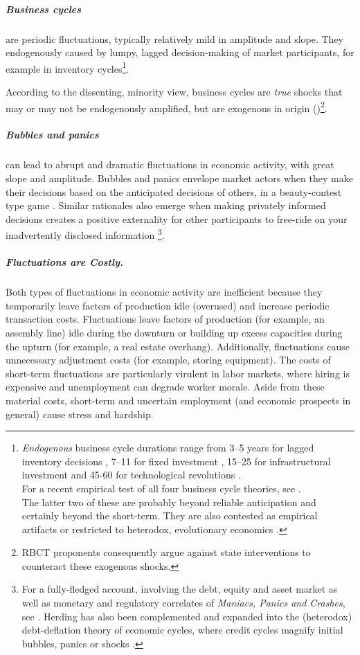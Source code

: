 \subparagraph{Business cycles} are periodic fluctuations, typically relatively mild in amplitude and slope. They endogenously caused by lumpy, lagged decision-making of market participants, for example in inventory cycles\footnote{
	\emph{Endogenous} business cycle durations range from 3--5 years for lagged inventory decisions \citep{Kitchin1923}, 7--11 for fixed investment \citep{Juglar1862}, 15--25 for infrastructural investment \citep{Kuznets1930} and 45-60 for technological revolutions \citep{Kondratiev1925}. \\ For a recent empirical test of all four business cycle theories, see \cite{Korotayev2010}. \\ The latter two of these are probably beyond reliable anticipation and certainly beyond the short-term. They are also contested as empirical artifacts \citep{Howrey1968} or restricted to heterodox, evolutionary economics \citep{Modelski2010}.}.

According to the dissenting, minority view, business cycles are \emph{true} shocks that may or may not be endogenously amplified, but are exogenous in origin (\citealt{Kydland1982})\footnote{
	\gls{RBCT} proponents consequently argue against state interventions to counteract these exogenous shocks.}.

\subparagraph{Bubbles and panics} can lead to abrupt and dramatic fluctuations in economic activity, with great slope and amplitude. Bubbles and panics envelope market actors when they make their decisions based on the anticipated decisions of others, in a beauty-contest type game \citep{Keynes1936}. Similar rationales also emerge when making privately informed decisions creates a positive externality for other participants to free-ride on your inadvertently disclosed information \citep{Banerjee-1992-aa}\footnote{
	For a fully-fledged account, involving the debt, equity and asset market as well as monetary and regulatory correlates of \emph{Maniacs, Panics and Crashes}, see \cite{KindlebergerAliber-2005-aa}. Herding has also been complemented and expanded into the (heterodox) debt-deflation theory of economic cycles, where credit cycles magnify initial bubbles, panics or shocks \citep{Fisher1933}.}.

\subparagraph{Fluctuations are Costly.} Both types of fluctuations in economic activity are inefficient because they temporarily leave factors of production idle (overused) and increase periodic transaction costs. Fluctuations  leave factors of production (for example, an assembly line) idle during the downturn or building up excess capacities during the upturn (for example, a real estate overhang). Additionally, fluctuations cause unnecessary adjustment costs (for example, storing equipment). The costs of short-term fluctuations are particularly virulent in labor markets, where hiring is expensive and unemployment can degrade worker morale. Aside from these material costs, short-term and uncertain employment (and economic prospects in general) cause stress and hardship.~%

